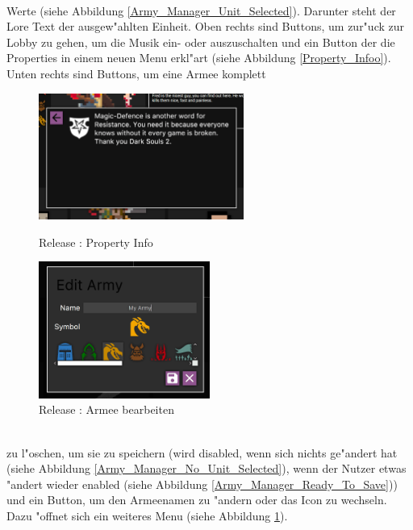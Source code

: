 \documentclass[12pt, titlepage]{scrartcl}
\newcommand{\RN}[1]{%
	\textup{\uppercase\expandafter{\romannumeral#1}}%
}
\begin{document}
			    \ \\ Werte (siehe Abbildung \ref{Army_Manager_Unit_Selected}). Darunter steht der Lore Text der ausgew"ahlten Einheit. Oben rechts sind Buttons, um zur"uck zur Lobby zu gehen, um die Musik ein- oder auszuschalten und ein Button der die Properties in einem neuen Menu erkl"art (siehe Abbildung \ref{Property_Infoo}). Unten rechts sind Buttons, um eine Armee komplett \\
			    \begin{figure}[H]
                    \centering
                    \begin{minipage}{0.6\textwidth}
                        \centering
                        \includegraphics[width=0.6\textwidth]{images/old_state/army_manager/PropertyInfo.png}
                        \caption{Release \RN{2}: Property Info}
                        \label{Property_Infoo}
                    \end{minipage}%
                    \begin{minipage}{0.5\textwidth}
                        \centering
                        \includegraphics[width=0.5\textwidth]{images/old_state/army_manager/EditArmy.png}
                        \caption{Release \RN{2}: Armee bearbeiten}
                        \label{Edit_Army}
                    \end{minipage}
                \end{figure}
                \ \\ zu l"oschen, um sie zu speichern (wird disabled, wenn sich nichts ge"andert hat (siehe Abbildung \ref{Army_Manager_No_Unit_Selected}), wenn der Nutzer etwas "andert wieder enabled (siehe Abbildung \ref{Army_Manager_Ready_To_Save})) und ein Button, um den Armeenamen zu "andern oder das Icon zu wechseln. Dazu "offnet sich ein weiteres Menu (siehe Abbildung \ref{Edit_Army}). \\
\end{document}
